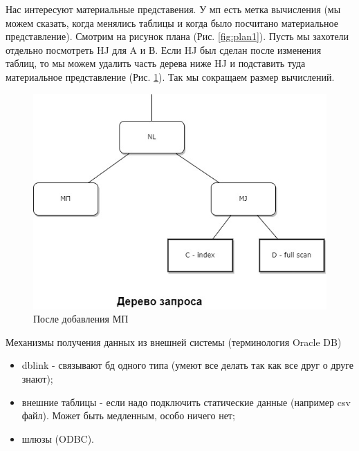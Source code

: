 Нас интересуют материальные представения. У мп есть метка вычисления (мы можем сказать, когда менялись таблицы и когда было посчитано материальное представление). Смотрим на рисунок плана (Рис. \ref{fig:plan1}). Пусть мы захотели отдельно посмотреть HJ для A и В. Если HJ был сделан после изменения таблиц, то мы можем удалить часть дерева ниже HJ и подставить туда материальное представление (Рис. \ref{fig:plan2}). Так мы сокращаем размер вычислений.  

 \begin{figure}[h!]
     \centering
     \includegraphics[scale = 0.5]{5/plan2.jpg}
     \caption{После добавления МП}
     \label{fig:plan2}
 \end{figure}

Механизмы получения данных из внешней системы (терминология  Oracle DB)
\begin{itemize}
    \item  dblink -  связывают бд одного типа (умеют все делать так как все друг о друге знают);
    \item внешние таблицы - если надо подключить статические данные (например csv файл). Может быть медленным, особо ничего нет;
    \item шлюзы (ODBC).
\end{itemize}
